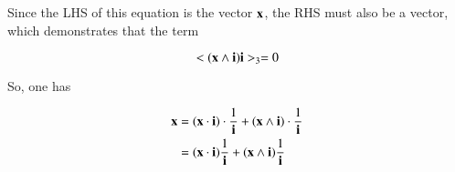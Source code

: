 \documentclass{article}
\begin{document}
Since the LHS of this equation is the vector $\mathbf{x}$, the RHS must
also be a vector, which demonstrates that the term

\[
<(\mathbf{x} \wedge \mathbf{i}) \mathbf{i}>_3 = 0
\]

So, one has

\begin{align*}
\mathbf{x} 
&=
{(\mathbf{x} \cdot \mathbf{i}) \cdot \frac{1}{\mathbf{i}}} + {(\mathbf{x} \wedge \mathbf{i}) \cdot \frac{1}{\mathbf{i}}} \\
&=
{(\mathbf{x} \cdot \mathbf{i}) \frac{1}{\mathbf{i}}} + {(\mathbf{x} \wedge \mathbf{i}) \frac{1}{\mathbf{i}}} \\
\end{align*}
\end{document}
